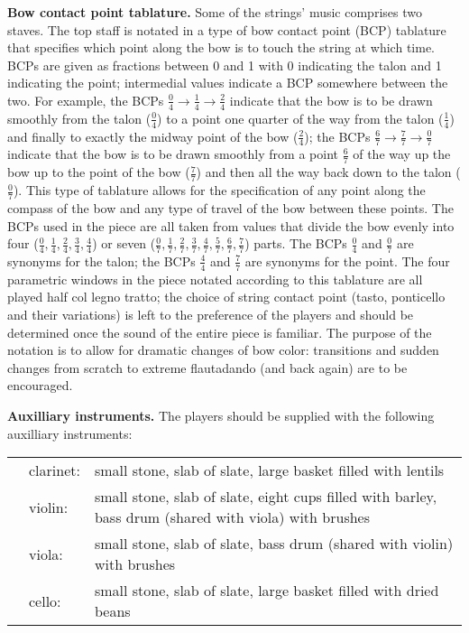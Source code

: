 \textbf{Bow contact point tablature.} Some of the strings' music comprises two
staves. The top staff is notated in a type of bow contact point (BCP) tablature
that specifies which point along the bow is to touch the string at which time.
BCPs are given as fractions between 0 and 1 with 0 indicating the talon and 1
indicating the point; intermedial values indicate a BCP somewhere between the
two. For example, the BCPs $\frac{0}{4} \longrightarrow \frac{1}{4}
\longrightarrow \frac{2}{4}$ indicate that the bow is to be drawn smoothly from
the talon ($\frac{0}{4}$) to a point one quarter of the way from the talon
($\frac{1}{4}$) and finally to exactly the midway point of the bow
($\frac{2}{4}$); the BCPs $\frac{6}{7} \longrightarrow \frac{7}{7}
\longrightarrow \frac{0}{7}$ indicate that the bow is to be drawn smoothly from
a point $\frac{6}{7}$ of the way up the bow up to the point of the bow
($\frac{7}{7}$) and then all the way back down to the talon ($\frac{0}{7}$).
This type of tablature allows for the specification of any point along the
compass of the bow and any type of travel of the bow between these points. The
BCPs used in the piece are all taken from values that divide the bow evenly
into four ($\frac{0}{4}, \frac{1}{4}, \frac{2}{4}, \frac{3}{4}, \frac{4}{4}$)
or seven ($\frac{0}{7}, \frac{1}{7}, \frac{2}{7}, \frac{3}{7}, \frac{4}{7},
\frac{5}{7}, \frac{6}{7}, \frac{7}{7}$) parts. The BCPs $\frac{0}{4}$ and
$\frac{0}{7}$ are synonyms for the talon; the BCPs $\frac{4}{4}$ and
$\frac{7}{7}$ are synonyms for the point. The four parametric windows in the
piece notated according to this tablature are all played half col legno tratto;
the choice of string contact point (tasto, ponticello and their variations) is
left to the preference of the players and should be determined once the sound
of the entire piece is familiar. The purpose of the notation is to allow for
dramatic changes of bow color: transitions and sudden changes from scratch to
extreme flautadando (and back again) are to be encouraged.

\textbf{Auxilliary instruments.} The players should be supplied with the
following auxilliary instruments:

\begin{tabu}{l l l}
\phantom{M} & clarinet: & small stone, slab of slate, large basket filled with lentils \\
            & violin: & small stone, slab of slate, eight cups filled with barley, bass drum (shared with viola) with brushes \\
            & viola: & small stone, slab of slate, bass drum (shared with violin) with brushes \\
            & cello: & small stone, slab of slate, large basket filled with dried beans \\
\end{tabu}

